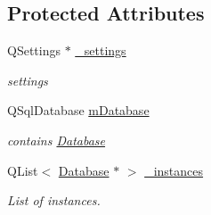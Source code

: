 \subsection*{Protected Attributes}
\begin{DoxyCompactItemize}
\item 
\hypertarget{classDatabase_a6cde413cb6d644c835406c09ec37947e}{Q\+Settings $\ast$ \hyperlink{classDatabase_a6cde413cb6d644c835406c09ec37947e}{\+\_\+settings}}\label{classDatabase_a6cde413cb6d644c835406c09ec37947e}

\begin{DoxyCompactList}\small\item\em settings \end{DoxyCompactList}\item 
\hypertarget{classDatabase_a64b9dbb3a5e6f42447a24caf726782e1}{Q\+Sql\+Database \hyperlink{classDatabase_a64b9dbb3a5e6f42447a24caf726782e1}{m\+Database}}\label{classDatabase_a64b9dbb3a5e6f42447a24caf726782e1}

\begin{DoxyCompactList}\small\item\em contains \hyperlink{classDatabase}{Database} \end{DoxyCompactList}\item 
\hypertarget{classDatabase_a9202583fae82c7f4ecbda6cb11b978c8}{Q\+List$<$ \hyperlink{classDatabase}{Database} $\ast$ $>$ \hyperlink{classDatabase_a9202583fae82c7f4ecbda6cb11b978c8}{\+\_\+instances}}\label{classDatabase_a9202583fae82c7f4ecbda6cb11b978c8}

\begin{DoxyCompactList}\small\item\em List of instances. \end{DoxyCompactList}\end{DoxyCompactItemize}
